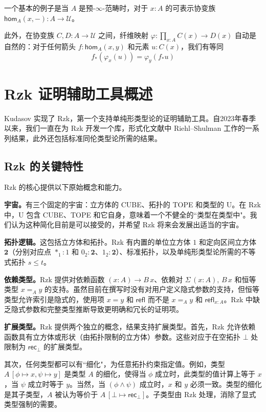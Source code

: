 \documentclass[12pt,a4paper]{article}
\theoremstyle{definition}
\theoremstyle{definition}
\begin{document}
一个基本的例子是当 $A$ 是预-$\infty$-范畴时，对于 $x:A$ 的可表示协变族 $\mathsf{hom}_A(x,-):A \to \mathcal{U}$。

此外，在协变族 $C,D:A \to \mathcal{U}$ 之间，纤维映射 $\varphi:\prod_{x:A} C(x) \to D(x)$ 自动是自然的：对于任何箭头 $f:\mathsf{hom}_A(x,y)$ 和元素 $u:C(x)$，我们有等同
\[
f_*(\varphi_x(u)) = \varphi_y(f_*u)
\]

\section{Rzk 证明辅助工具概述}

Kudasov 实现了 Rzk，第一个支持单纯形类型论的证明辅助工具。自2023年春季以来，我们一直在为 Rzk 开发一个库，形式化文献中 Riehl--Shulman 工作的一系列结果，此外还包括标准同伦类型论所需的结果。

\subsection{Rzk 的关键特性}

Rzk 的核心提供以下原始概念和能力。

\textbf{宇宙。}有三个固定的宇宙：立方体的 CUBE、拓扑的 TOPE 和类型的 U。在 Rzk 中，U 包含 CUBE、TOPE 和它自身，意味着一个不健全的``类型在类型中"。我们认为这种简化目前是可以接受的，并希望 Rzk 将来会发展出适当的宇宙。

\textbf{拓扑逻辑。}这包括立方体和拓扑。Rzk 有内置的单位立方体 $1$ 和定向区间立方体 $\mathbf{2}$（分别对应点 $*_1:1$ 和 $0_2:\mathbf{2}$、$1_2:\mathbf{2}$）、标准拓扑，以及单纯形类型论所需的不等式拓扑 $s \leq t$。

\textbf{依赖类型。}Rzk 提供对依赖函数 $(x:A) \to B\,x$、依赖对 $\Sigma\,(x:A),\,B\,x$ 和恒等类型 $x =_A y$ 的支持。虽然目前在撰写时没有对用户定义隐式参数的支持，但恒等类型允许索引是隐式的，使用项 $x = y$ 和 $\mathsf{refl}$ 而不是 $x =_A y$ 和 $\mathsf{refl}_{x:A}$。Rzk 中缺乏隐式参数和完整类型推断导致更明确和冗长的证明项。

\textbf{扩展类型。}Rzk 提供两个独立的概念，结果支持扩展类型。首先，Rzk 允许依赖函数具有立方体或形状（由拓扑限制的立方体）参数。这些对应于在空拓扑 $\bot$ 处限制为 $\mathsf{rec}_\bot$ 的扩展类型。

其次，任何类型都可以有``细化"，为任意拓扑约束指定值。例如，类型 $A\,[\phi \mapsto x, \psi \mapsto y]$ 是类型 $A$ 的细化，使得当 $\phi$ 成立时，此类型的值计算上等于 $x$，当 $\psi$ 成立时等于 $y$。当然，当 $(\phi \land \psi)$ 成立时，$x$ 和 $y$ 必须一致。类型的细化是其子类型，$A$ 被认为等价于 $A\,[\bot \mapsto \mathsf{rec}_\bot]$。子类型由 Rzk 处理，消除了显式类型强制的需要。
\end{document}
